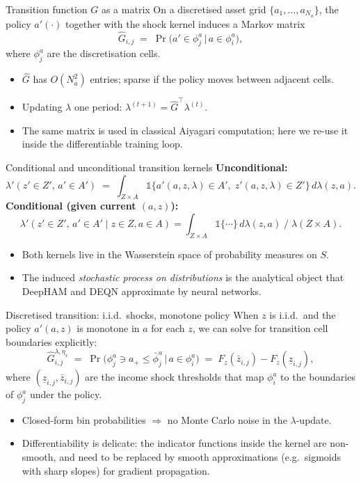 \documentclass[10pt,english,aspectratio=169]{beamer}
\begin{document}
\begin{frame}{Transition function $G$ as a matrix}
On a discretised asset grid $\{a_1,\ldots,a_{N_a}\}$, the policy $a'(\cdot)$ together with the shock kernel induces a Markov matrix
\[
\hat G_{i,j} \;=\; \Pr\!\big(a' \in \phi_j^a \,\big|\, a \in \phi_i^a\big),
\]
where $\phi_j^a$ are the discretisation cells.
\medskip
\begin{itemize}
\item $\hat G$ has $O(N_a^2)$ entries; sparse if the policy moves between adjacent cells.
\item Updating $\lambda$ one period: $\lambda^{(t+1)} = \hat G^\top \lambda^{(t)}$.
\item The same matrix is used in classical Aiyagari computation; here we re-use it inside the differentiable training loop.
\end{itemize}
\end{frame}

\begin{frame}{Conditional and unconditional transition kernels}
\textbf{Unconditional:}
\[
\lambda'(z' \in Z',\, a' \in A')
\;=\;
\int_{Z\times A} \mathbb{1}\!\big\{a'(a,z,\lambda)\in A',\; z'(a,z,\lambda)\in Z'\big\}\, d\lambda(z,a).
\]
\medskip
\textbf{Conditional (given current $(a,z)$):}
\[
\lambda'(z' \in Z',\, a' \in A' \mid z\in Z, a\in A)
=
\int_{Z\times A}\!\!\mathbb{1}\!\{\cdots\}\, d\lambda(z,a) \;/\; \lambda(Z\times A).
\]
\medskip
\begin{itemize}
\item Both kernels live in the Wasserstein space of probability measures on $S$.
\item The induced \emph{stochastic process on distributions} is the analytical object that DeepHAM and DEQN approximate by neural networks.
\end{itemize}
\end{frame}

\begin{frame}{Discretised transition: i.i.d.\ shocks, monotone policy}
When $z$ is i.i.d.\ and the policy $a'(a,z)$ is monotone in $a$ for each $z$, we can solve for transition cell boundaries explicitly:
\[
\hat G^{\lambda,\eta_x}_{i,j}
\;=\; \Pr\!\big(\phi_j^a \ni a_+ \leq \bar\phi_j^a \,\big|\, a \in \phi_i^a\big)
\;=\; F_z(\bar z_{i,j}) - F_z(\underline z_{i,j}),
\]
where $(\underline z_{i,j}, \bar z_{i,j})$ are the income shock thresholds that map $\phi_i^a$ to the boundaries of $\phi_j^a$ under the policy.
\medskip
\begin{itemize}
\item Closed-form bin probabilities $\Rightarrow$ no Monte Carlo noise in the $\lambda$-update.
\item Differentiability is delicate: the indicator functions inside the kernel are non-smooth, and need to be replaced by smooth approximations (e.g.\ sigmoids with sharp slopes) for gradient propagation.
\end{itemize}
\end{frame}
\end{document}
